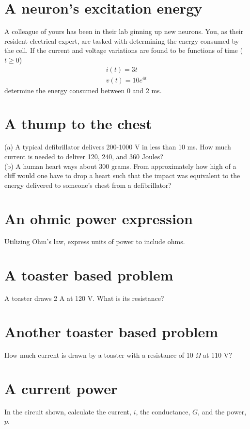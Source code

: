 \documentclass[11pt]{book}
\begin{document}
\section{A neuron's excitation energy}
A colleague of yours has been in their lab ginning up new neurons. You, as their resident electrical expert, are tasked with determining the energy consumed by the cell. If the current and voltage variations are found to be functions of time ($t \geq 0$)
\begin{eqnarray}
	i(t) = 3t \\
	v(t) = 10 e^{6t}
\end{eqnarray}
determine the energy consumed between 0 and 2 ms.


\section{A thump to the chest}
(a) A typical defibrillator delivers 200-1000 V in less than 10 ms. How much current is needed to deliver 120, 240, and 360 Joules?
\\
(b) A human heart ways about 300 grams. From approximately how high of a cliff would one have to drop a heart such that the impact was equivalent to the energy delivered to someone's chest from a defibrillator?

\section{An ohmic power expression}
Utilizing Ohm's law, express units of power to include ohms.



\section{A toaster based problem}
A toaster draws 2 A at 120 V. What is its resistance?

\section{Another toaster based problem}
How much current is drawn by a toaster with a resistance of 10 $\Omega$ at 110 V?


\section{A current power}
In the circuit shown, calculate the current, $i$, the conductance, $G$, and the power, $p$.
\end{document}
